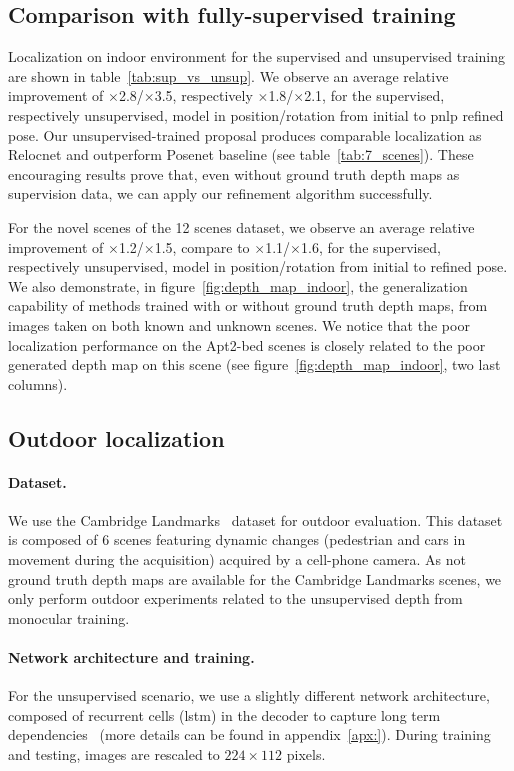 

\subsection{Comparison with fully-supervised training}
Localization on indoor environment for the supervised and unsupervised training are shown in table~\ref{tab:sup_vs_unsup}. We observe an average relative improvement of $\times$2.8/$\times$3.5, respectively $\times$1.8/$\times$2.1, for the supervised, respectively unsupervised, model in position/rotation from initial to \ac{pnlp} refined pose.  Our unsupervised-trained proposal produces comparable localization as Relocnet and outperform Posenet baseline (see table~\ref{tab:7_scenes}). These encouraging results prove that, even without ground truth depth maps as supervision data, we can apply our refinement algorithm successfully.

For the novel scenes of the 12 scenes dataset, we observe an average relative improvement of $\times$1.2/$\times$1.5, compare to $\times$1.1/$\times$1.6, for the supervised, respectively unsupervised, model in position/rotation from initial to refined pose. We also demonstrate, in figure~\ref{fig:depth_map_indoor}, the generalization capability of methods trained with or without ground truth depth maps, from images taken on both known and unknown scenes. We notice that the poor localization performance on the Apt2-bed scenes is closely related to the poor generated depth map on this scene (see figure~\ref{fig:depth_map_indoor}, two last columns).

\subsection{Outdoor localization}
\paragraph{Dataset.} We use the Cambridge Landmarks~\citep{Kendall2015} dataset for outdoor evaluation. This dataset is composed of 6 scenes featuring dynamic changes (pedestrian and cars in movement during the acquisition) acquired by a cell-phone camera. As not ground truth depth maps are available for the Cambridge Landmarks scenes, we only perform outdoor experiments related to the unsupervised depth from monocular training.

\paragraph{Network architecture and training.} For the unsupervised scenario, we use a slightly different network architecture, composed of recurrent cells (\ac{lstm}) in the decoder to capture long term dependencies~\citep{Visin2015, Li2016b} (more details can be found in appendix~\ref{apx:}). During training and testing, images are rescaled to $224 \times 112$ pixels.

